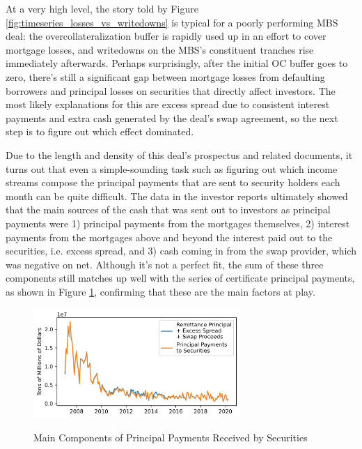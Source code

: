 \documentclass[12pt]{article}
\begin{document}
At a very high level, the story told by Figure \ref{fig:timeseries_losses_vs_writedowns} is typical for a poorly performing MBS deal: the overcollateralization buffer is rapidly used up in an effort to cover mortgage losses, and writedowns on the MBS’s constituent tranches rise immediately afterwards. Perhaps surprisingly, after the initial OC buffer goes to zero, there’s still a significant gap between mortgage losses from defaulting borrowers and principal losses on securities that directly affect investors. The most likely explanations for this are excess spread due to consistent interest payments and extra cash generated by the deal’s swap agreement, so the next step is to figure out which effect dominated.

	Due to the length and density of this deal's prospectus and related documents, it turns out that even a simple-sounding task such as figuring out which income streams compose the principal payments that are sent to security holders each month can be quite difficult. The data in the investor reports ultimately showed that the main sources of the cash that was sent out to investors as principal payments were 1) principal payments from the mortgages themselves, 2) interest payments from the mortgages above and beyond the interest paid out to the securities, i.e. excess spread, and 3) cash coming in from the swap provider, which was negative on net. Although it’s not a perfect fit, the sum of these three components still matches up well with the series of certificate principal payments, as shown in Figure \ref{fig:timeseries_security_principal_pmts_composition}, confirming that these are the main factors at play.

\begin{figure}[h]
	\centering
	\caption{Main Components of Principal Payments Received by Securities}
	\includegraphics[width=0.7\textwidth]{../figures/timeseries_security_principal_pmts_composition}
	\label{fig:timeseries_security_principal_pmts_composition}
\end{figure}
\end{document}
